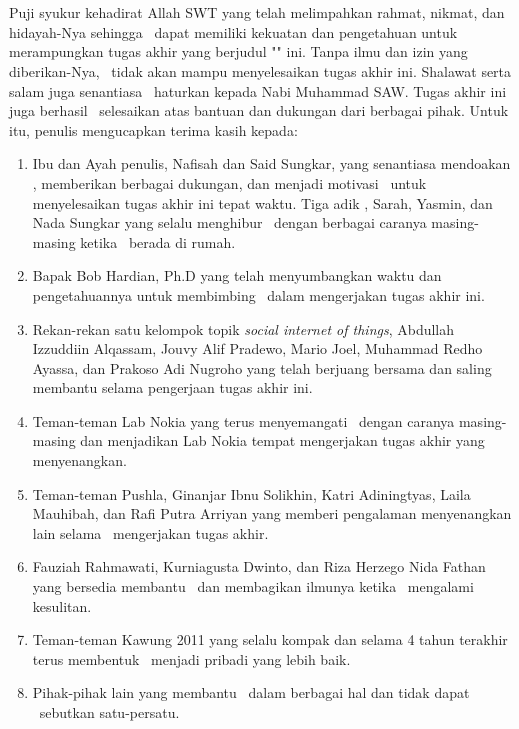 \chapter*{\kataPengantar}
Puji syukur kehadirat Allah SWT yang telah melimpahkan rahmat, nikmat, dan hidayah-Nya sehingga \saya~dapat memiliki kekuatan dan pengetahuan untuk merampungkan tugas akhir yang berjudul "\judul" ini. Tanpa ilmu dan izin yang diberikan-Nya, \saya~tidak akan mampu menyelesaikan tugas akhir ini. Shalawat serta salam juga senantiasa \saya~haturkan kepada Nabi Muhammad SAW. Tugas akhir ini juga berhasil \saya~selesaikan atas bantuan dan dukungan dari berbagai pihak. Untuk itu, penulis mengucapkan terima kasih kepada:
\begin{enumerate}
	\item Ibu dan Ayah penulis, Nafisah dan Said Sungkar, yang senantiasa mendoakan \saya, memberikan berbagai dukungan, dan menjadi motivasi \saya~untuk menyelesaikan tugas akhir ini tepat waktu. Tiga adik \saya, Sarah, Yasmin, dan Nada Sungkar yang selalu menghibur \saya~dengan berbagai caranya masing-masing ketika \saya~berada di rumah.
	\item Bapak Bob Hardian, Ph.D yang telah menyumbangkan waktu dan pengetahuannya untuk membimbing \saya~dalam mengerjakan tugas akhir ini.
	\item Rekan-rekan satu kelompok topik \textit{social internet of things}, Abdullah Izzuddiin Alqassam, Jouvy Alif Pradewo, Mario Joel, Muhammad Redho Ayassa, dan Prakoso Adi Nugroho yang telah berjuang bersama dan saling membantu selama pengerjaan tugas akhir ini.
	\item Teman-teman Lab Nokia yang terus menyemangati \saya~dengan caranya masing-masing dan menjadikan Lab Nokia tempat mengerjakan tugas akhir yang menyenangkan.
	\item Teman-teman Pushla, Ginanjar Ibnu Solikhin, Katri Adiningtyas, Laila Mauhibah, dan Rafi Putra Arriyan yang memberi pengalaman menyenangkan lain selama \saya~mengerjakan tugas akhir.
	\item Fauziah Rahmawati, Kurniagusta Dwinto, dan Riza Herzego Nida Fathan yang bersedia membantu \saya~dan membagikan ilmunya ketika \saya~mengalami kesulitan.
	\item Teman-teman Kawung 2011 yang selalu kompak dan selama 4 tahun terakhir terus membentuk \saya~menjadi pribadi yang lebih baik.
	\item Pihak-pihak lain yang membantu \saya~dalam berbagai hal dan tidak dapat \saya~sebutkan satu-persatu.
\end{enumerate}

